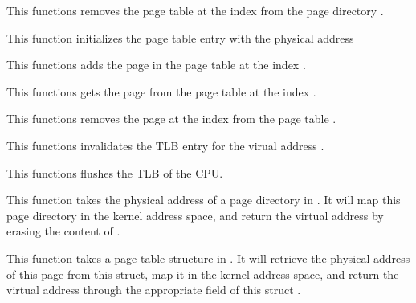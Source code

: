 {
  This functions removes the page table at the index  from the
  page directory .
}

{
  This function initializes the page table entry  with the
  physical address 
}

{
  This functions adds the page  in the page table
   at the index .
}

{
  This functions gets the page  from the page table
   at the index .
}

{
  This functions removes the page at the index  from the
  page table .
}

{
  This functions invalidates the TLB entry for the virual address
  .
}

{
  This functions flushes the TLB of the CPU.
}

{
  This function takes the physical address of a page directory in .
  It will map this page directory in the kernel address space, and return
  the virtual address by erasing the content of .
}

{
  This function takes a page table structure in . It will retrieve
  the physical address of this page from this struct, map it in the kernel address
  space, and return the virtual address through the appropriate field of this
  struct .
}

